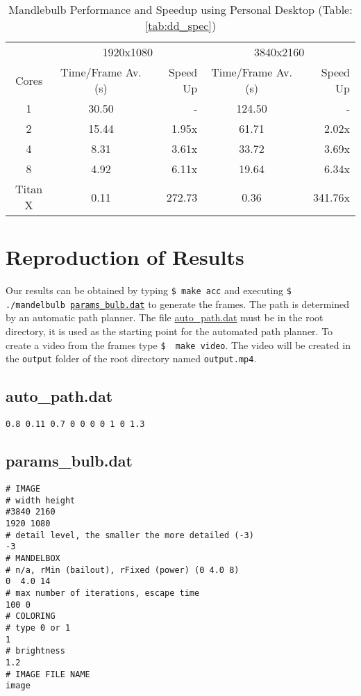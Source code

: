 \documentclass[]{article}
\begin{document}
\begin{table}[h!]
\centering
\begin{tabular}{|c|c|r|c|r|} \hline
& \multicolumn{2}{c|}{1920x1080} & \multicolumn{2}{c|}{3840x2160} \\ \cline{2-5}
Cores & Time/Frame Av. (s)  & Speed Up & Time/Frame Av. (s) & Speed Up \\ 
\hline
1 & 30.50 & - & 124.50 & -\\
2 & 15.44 & 1.95x & 61.71  & 2.02x \\
4 & 8.31  & 3.61x & 33.72  & 3.69x\\
8 & 4.92  & 6.11x & 19.64  & 6.34x\\ 
\hline
Titan X & 0.11 & 272.73 & 0.36 & 341.76x\\ \hline
\end{tabular}
\caption{Mandlebulb Performance and Speedup using Personal Desktop (Table: \ref{tab:dd_spec}) }
\end{table}

\section{Reproduction of Results}
Our results can be obtained by typing \texttt{\$ make acc} and executing \texttt{\$ ./mandelbulb \hyperref[subsec:params_bulb]{params\_bulb.dat}} to generate the frames. The path is determined by an automatic path planner. The file \hyperref[subsec:auto_path]{auto\_path.dat} must be in the root directory, it is used as the starting point for the automated path planner. To create a video from the frames type \texttt{\$~ make video}. The video will be created in the \texttt{output} folder of the root directory named \texttt{output.mp4}.

\subsection{auto\_path.dat}\label{subsec:auto_path}
\begin{Verbatim}[fontsize= \footnotesize, tabsize=4]
0.8 0.11 0.7 0 0 0 0 1 0 1.3
\end{Verbatim}

\subsection{params\_bulb.dat}\label{subsec:params_bulb}
\begin{Verbatim}[fontsize= \footnotesize, tabsize=4]
# IMAGE
# width height
#3840 2160
1920 1080
# detail level, the smaller the more detailed (-3)
-3
# MANDELBOX
# n/a, rMin (bailout), rFixed (power) (0 4.0 8)
0  4.0 14
# max number of iterations, escape time
100 0
# COLORING
# type 0 or 1
1
# brightness
1.2
# IMAGE FILE NAME
image
\end{Verbatim}
\end{document}
